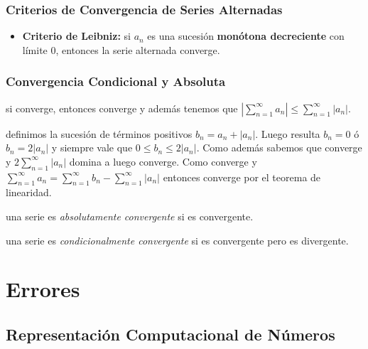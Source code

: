 \hypertarget{criterios-de-convergencia-de-series-alternadas}{%
\subsubsection{Criterios de Convergencia de Series
Alternadas}\label{criterios-de-convergencia-de-series-alternadas}}

\begin{itemize}
\tightlist
\item
  \textbf{Criterio de Leibniz:} si \(a_n\) es una sucesión
  \textbf{monótona decreciente} con límite 0, entonces la serie
  alternada  converge.
\end{itemize}

\hypertarget{convergencia-condicional-y-absoluta}{%
\subsubsection{Convergencia Condicional y
Absoluta}\label{convergencia-condicional-y-absoluta}}

\Teorema si  converge, entonces  converge y
además tenemos que
\(|\ensuremath{\sum_{n=1}^\infty a_n}| \leq \ensuremath{\sum_{n=1}^\infty |a_n|}\).

\Demostracion definimos la sucesión de términos positivos
\(b_n = a_n +|a_n|\). Luego resulta \(b_n = 0\) ó \(b_n = 2 |a_n |\) y
siempre vale que \(0 \leq b_n \leq 2|a_n|\). Como además sabemos que
 converge y \(2\ensuremath{\sum_{n=1}^\infty |a_n|}\)
domina a  luego  converge. Como 
converge y
\(\ensuremath{\sum_{n=1}^\infty a_n} = \ensuremath{\sum_{n=1}^\infty b_n} - \ensuremath{\sum_{n=1}^\infty |a_n|}\)
entonces  converge por el teorema de linearidad.

\Definicion una serie  es \emph{absolutamente convergente} si
 es convergente.

\Definicion una serie  es \emph{condicionalmente convergente}
si  es convergente pero  es divergente.

\hypertarget{errores}{%
\section{Errores}\label{errores}}

\hypertarget{representaciuxf3n-computacional-de-nuxfameros}{%
\subsection{Representación Computacional de
Números}\label{representaciuxf3n-computacional-de-nuxfameros}}

